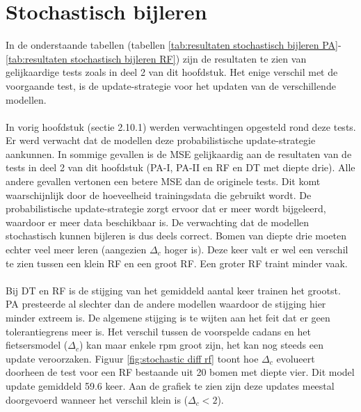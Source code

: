 \section{Stochastisch bijleren}
In de onderstaande tabellen (tabellen \ref{tab:resultaten stochastisch bijleren PA}-\ref{tab:resultaten stochastisch bijleren RF}) zijn de resultaten te zien van gelijkaardige tests zoals in deel 2 van dit hoofdstuk. Het enige verschil met de voorgaande test, is de update-strategie voor het updaten van de verschillende modellen.
\\\\
In vorig hoofdstuk (sectie 2.10.1) werden verwachtingen opgesteld rond deze tests. Er werd verwacht dat de modellen deze probabilistische update-strategie aankunnen. In sommige gevallen is de MSE gelijkaardig aan de resultaten van de tests in deel 2 van dit hoofdstuk (PA-I, PA-II en RF en DT met diepte drie). Alle andere gevallen vertonen een betere MSE dan de originele tests. Dit komt waarschijnlijk door de hoeveelheid trainingsdata die gebruikt wordt. De probabilistische update-strategie zorgt ervoor dat er meer wordt bijgeleerd, waardoor er meer data beschikbaar is. De verwachting dat de modellen stochastisch kunnen bijleren is dus deels correct. Bomen van diepte drie moeten echter veel meer leren (aangezien $\Delta_c$ hoger is). Deze keer valt er wel een verschil te zien tussen een klein RF en een groot RF. Een groter RF traint minder vaak.
\\\\
Bij DT en RF is de stijging van het gemiddeld aantal keer trainen het grootst. PA presteerde al slechter dan de andere modellen waardoor de stijging hier minder extreem is. De algemene stijging is te wijten aan het feit dat er geen tolerantiegrens meer is. Het verschil tussen de voorspelde cadans en het fietsersmodel ($\Delta_c$) kan maar enkele rpm groot zijn, het kan nog steeds een update veroorzaken. Figuur \ref{fig:stochastic diff rf} toont hoe $\Delta_c$ evolueert doorheen de test voor een RF bestaande uit 20 bomen met diepte vier. Dit model update gemiddeld 59.6 keer. Aan de grafiek te zien zijn deze updates meestal doorgevoerd wanneer het verschil klein is ($\Delta_c<2$).
 

